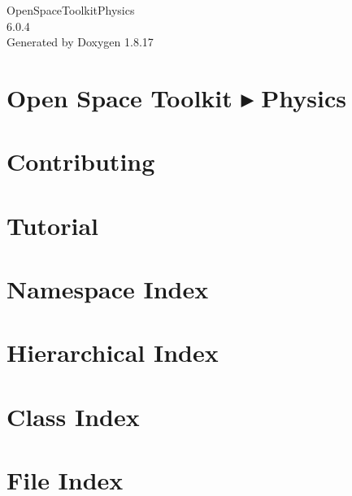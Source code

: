 \let\mypdfximage\pdfximage\def\pdfximage{\immediate\mypdfximage}\documentclass[twoside]{book}
\newcommand{\+}{\discretionary{\mbox{\scriptsize$\hookleftarrow$}}{}{}}
\newcommand{\clearemptydoublepage}{%
  \newpage{\pagestyle{empty}\cleardoublepage}%
}
\begin{document}
\hypersetup{pageanchor=false,
             bookmarksnumbered=true,
             pdfencoding=unicode
            }
\begin{titlepage}
\vspace*{7cm}
\begin{center}%
{\Large Open\+Space\+Toolkit\+Physics \\[1ex]\large 6.\+0.\+4 }\\
\vspace*{1cm}
{\large Generated by Doxygen 1.8.17}\\
\end{center}
\end{titlepage}
\clearemptydoublepage
{}
\tableofcontents
\clearemptydoublepage
{}
\hypersetup{pageanchor=true}

\chapter{Open Space Toolkit ▸ Physics}
\label{index}\hypertarget{index}{}
\chapter{Contributing}
\label{md__c_o_n_t_r_i_b_u_t_i_n_g}

\chapter{Tutorial}
\label{md_docs__tutorial}

\chapter{Namespace Index}

\chapter{Hierarchical Index}

\chapter{Class Index}

\chapter{File Index}

\end{document}
